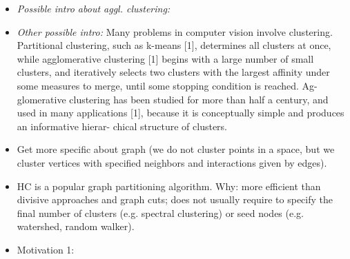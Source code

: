\begin{itemize}



\item \emph{Possible intro about aggl. clustering:}  %



\item \emph{Other possible intro:} Many problems in computer vision involve clustering. Partitional clustering, such as k-means [1], determines all clusters at once, while agglomerative clustering [1] begins with a large number of small clusters, and iteratively selects two clusters with the largest affinity under some measures to merge, until some stopping condition is reached. Ag- glomerative clustering has been studied for more than half a century, and used in many applications [1], because it is conceptually simple and produces an informative hierar- chical structure of clusters. %

\item Get more specific about graph (we do not cluster points in a space, but we cluster vertices with specified neighbors and interactions given by edges). 

\item HC is a popular graph partitioning algorithm. Why: more efficient than divisive approaches and graph cuts; does not usually require to specify the final number of clusters (e.g. spectral clustering) or seed nodes (e.g. watershed, random walker). 

\item Motivation 1:

\begin{itemize}


\end{itemize}
\end{itemize}
